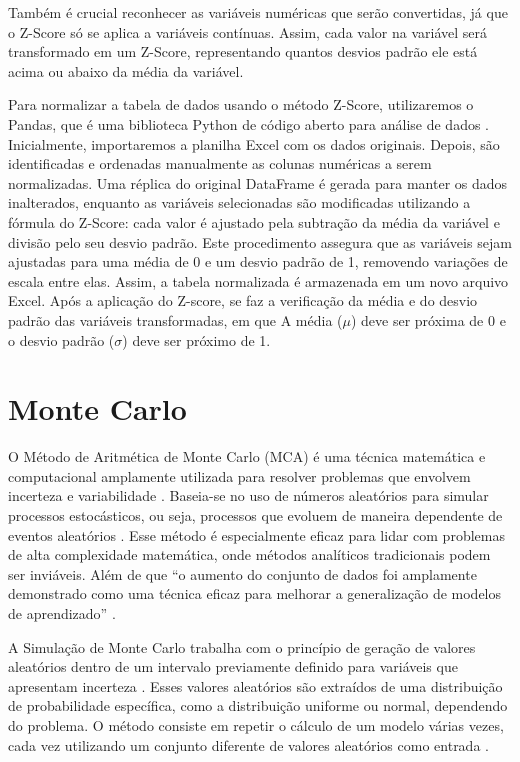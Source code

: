 \begin{apendicesenv}
Também é crucial reconhecer as variáveis numéricas que serão convertidas, já que o Z-Score só se aplica a variáveis contínuas. Assim, cada valor na variável será transformado em um Z-Score, representando quantos desvios padrão ele está acima ou abaixo da média da variável. 

Para normalizar a tabela de dados usando o método Z-Score, utilizaremos o  Pandas, que é uma biblioteca Python de código aberto para análise de dados \cite{chen2018}. Inicialmente, importaremos a planilha Excel com os dados originais. Depois, são identificadas e ordenadas manualmente as colunas numéricas a serem normalizadas. Uma réplica do original DataFrame é gerada para manter os dados inalterados, enquanto as variáveis selecionadas são modificadas utilizando a fórmula do Z-Score: cada valor é ajustado pela subtração da média da variável e divisão pelo seu desvio padrão. Este procedimento assegura que as variáveis sejam ajustadas para uma média de 0 e um desvio padrão de 1, removendo variações de escala entre elas. Assim, a tabela normalizada é armazenada em um novo arquivo Excel. Após a aplicação do Z-score, se faz a verificação da média e do desvio padrão das variáveis transformadas, em que A média (\(\mu\)) deve ser próxima de 0 e o desvio padrão (\(\sigma\))  deve ser próximo de 1.

\chapter{Monte Carlo}

O Método de Aritmética de Monte Carlo (MCA) é uma técnica matemática e computacional amplamente utilizada para resolver problemas que envolvem incerteza e variabilidade \cite{kalos2009}. Baseia-se no uso de números aleatórios para simular processos estocásticos, ou seja, processos que evoluem de maneira dependente de eventos aleatórios \cite{kalos2009}. Esse método é especialmente eficaz para lidar com problemas de alta complexidade matemática, onde métodos analíticos tradicionais podem ser inviáveis. Além de que “o aumento do conjunto de dados foi amplamente demonstrado como uma técnica eficaz para melhorar a generalização de modelos de aprendizado” \cite{kiar2021}.

A Simulação de Monte Carlo trabalha com o princípio de geração de valores aleatórios dentro de um intervalo previamente definido para variáveis que apresentam incerteza \cite{kalos2009}. Esses valores aleatórios são extraídos de uma distribuição de probabilidade específica, como a distribuição uniforme ou normal, dependendo do problema. O método consiste em repetir o cálculo de um modelo várias vezes, cada vez utilizando um conjunto diferente de valores aleatórios como entrada \cite{kalos2009}. 


\end{apendicesenv}
